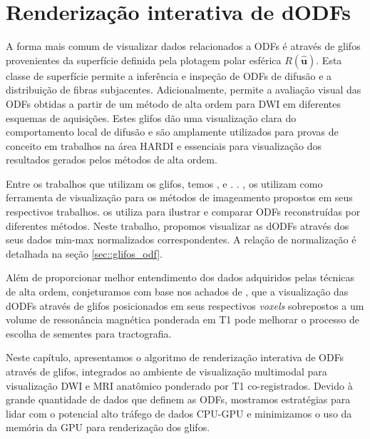 \chapter{Renderização interativa de dODFs}
\label{chap::renderizacao_interativa_de_perfis_de_difusao}


A forma mais comum de visualizar dados  relacionados a ODFs é através de glifos provenientes da superfície definida pela plotagem polar esférica $R(\mathbf{\hat{u}})$. Esta classe de superfície permite a inferência e inspeção de ODFs de difusão e a distribuição de fibras subjacentes. Adicionalmente, permite a avaliação visual das ODFs obtidas a partir de um método de alta ordem para DWI em diferentes esquemas de aquisições. Estes glifos dão uma visualização clara do comportamento local de difusão e são amplamente utilizados para provas de conceito em trabalhos na área HARDI e essenciais para visualização dos resultados gerados pelos métodos de alta ordem.

Entre os trabalhos que utilizam os glifos, temos ,   e  .  . ,   os utilizam como ferramenta de visualização para os métodos de imageamento propostos em seus respectivos trabalhos.  os utiliza para ilustrar e comparar ODFs reconstruídas por diferentes métodos.
Neste trabalho, propomos visualizar as dODFs através dos seus dados min-max normalizados correspondentes. A relação de normalização é detalhada na seção \ref{sec::glifos_odf}.

Além de proporcionar melhor entendimento dos dados adquiridos pelas técnicas de alta ordem, conjeturamos com base nos achados de , que a visualização das dODFs através de glifos posicionados em seus respectivos \textit{voxels} sobrepostos a um volume de ressonância magnética ponderada em T1 pode melhorar o processo de escolha de sementes para tractografia.

Neste capítulo, apresentamos o algoritmo de renderização interativa de ODFs através de glifos, integrados ao ambiente de visualização multimodal para visualização DWI e MRI anatômico ponderado por T1 co-registrados. Devido à grande quantidade de dados que definem as ODFs, mostramos estratégias para lidar com o potencial alto tráfego de dados CPU-GPU e minimizamos o uso da memória da GPU para renderização dos glifos.

